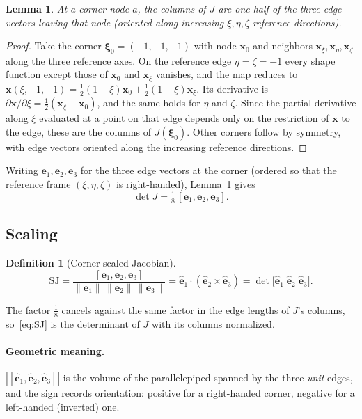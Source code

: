 \documentclass[11pt]{article}
\newtheorem{lemma}{Lemma}
\theoremstyle{definition}
\newtheorem{definition}{Definition}
\theoremstyle{remark}
\newcommand{\vb}[1]{\bm{#1}}
\newcommand{\uv}[1]{\hat{\bm{#1}}}
\newcommand{\SJ}{\mathrm{SJ}}
\begin{document}
\begin{lemma}\label{lem:cornerJ}
At a corner node $a$, the columns of $J$ are one half of the three edge vectors leaving
that node (oriented along increasing $\xi,\eta,\zeta$ reference directions).
\end{lemma}
\begin{proof}
Take the corner $\bm{\xi}_0=(-1,-1,-1)$ with node $\vb{x}_0$ and neighbors $\vb{x}_\xi,\vb{x}_\eta,\vb{x}_\zeta$
along the three reference axes. On the reference edge $\eta=\zeta=-1$ every shape
function except those of $\vb{x}_0$ and $\vb{x}_\xi$ vanishes, and the map reduces to
$\vb{x}(\xi,-1,-1)=\tfrac12(1-\xi)\vb{x}_0+\tfrac12(1+\xi)\vb{x}_\xi$. Its derivative is
$\partial\vb{x}/\partial\xi=\tfrac12(\vb{x}_\xi-\vb{x}_0)$, and the same holds for $\eta$ and $\zeta$.
Since the partial derivative along $\xi$ evaluated at a point on that edge depends only on the
restriction of $\vb{x}$ to the edge, these are the columns of $J(\bm{\xi}_0)$. Other corners follow by
symmetry, with edge vectors oriented along the increasing reference directions.
\end{proof}

Writing $\vb{e}_1,\vb{e}_2,\vb{e}_3$ for the three edge vectors at the corner (ordered so that the
reference frame $(\xi,\eta,\zeta)$ is right-handed), Lemma~\ref{lem:cornerJ} gives
\begin{equation}
  \det J = \tfrac18\,[\vb{e}_1,\vb{e}_2,\vb{e}_3].
\end{equation}

\subsection{Scaling}

\begin{definition}[Corner scaled Jacobian]
\begin{equation}
  \boxed{\SJ = \frac{[\vb{e}_1,\vb{e}_2,\vb{e}_3]}{\|\vb{e}_1\|\,\|\vb{e}_2\|\,\|\vb{e}_3\|}
  = \uv{e}_1\cdot(\uv{e}_2\times\uv{e}_3) = \det\big[\uv{e}_1\;\uv{e}_2\;\uv{e}_3\big].}
  \label{eq:SJ}
\end{equation}
\end{definition}
The factor $\tfrac18$ cancels against the same factor in the edge lengths of $J$'s columns,
so~\eqref{eq:SJ} is the determinant of $J$ with its columns normalized.

\paragraph{Geometric meaning.} $|[\uv{e}_1,\uv{e}_2,\uv{e}_3]|$ is the volume of the
parallelepiped spanned by the three \emph{unit} edges, and the sign records orientation:
positive for a right-handed corner, negative for a left-handed (inverted) one.
\end{document}
